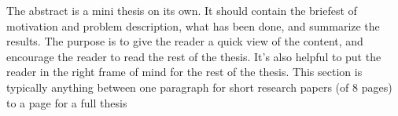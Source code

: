 The abstract is a mini thesis on its own. It should contain the briefest of motivation and problem description, what has been done, and summarize the results. The purpose is to give the reader a quick view of the content, and encourage the reader to read the rest of the thesis. It's also helpful to put the reader in the right frame of mind for the rest of the thesis. This section is typically anything between one paragraph for short research papers (of 8 pages) to a page for a full thesis